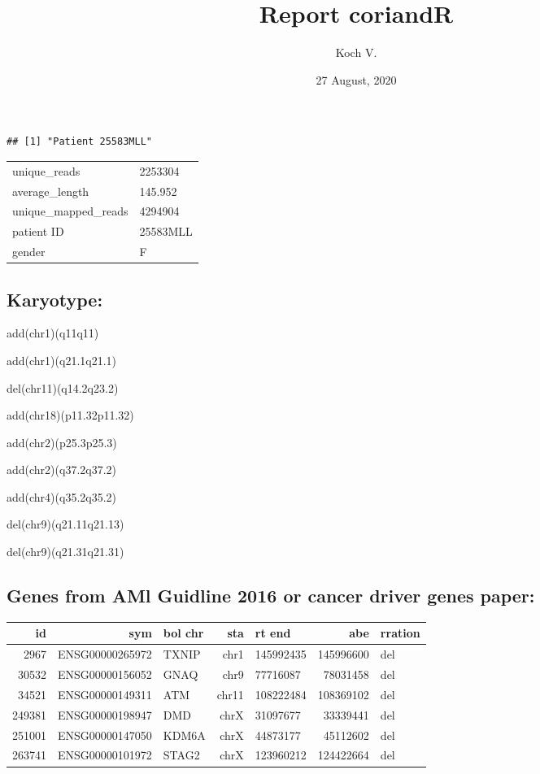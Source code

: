 \documentclass[]{article}
\title{Report coriandR}
\author{Koch V.}
\date{27 August, 2020}
\begin{document}
\maketitle

\begin{verbatim}
## [1] "Patient 25583MLL"
\end{verbatim}

\begin{longtable}[]{@{}ll@{}}
\toprule
\endhead
unique\_reads & 2253304\tabularnewline
average\_length & 145.952\tabularnewline
unique\_mapped\_reads & 4294904\tabularnewline
patient ID & 25583MLL\tabularnewline
gender & F\tabularnewline
\bottomrule
\end{longtable}

\hypertarget{karyotype}{%
\subsection{Karyotype:}\label{karyotype}}

add(chr1)(q11q11)

add(chr1)(q21.1q21.1)

del(chr11)(q14.2q23.2)

add(chr18)(p11.32p11.32)

add(chr2)(p25.3p25.3)

add(chr2)(q37.2q37.2)

add(chr4)(q35.2q35.2)

del(chr9)(q21.11q21.13)

del(chr9)(q21.31q21.31)

\hypertarget{genes-from-aml-guidline-2016-or-cancer-driver-genes-paper}{%
\subsection{Genes from AMl Guidline 2016 or cancer driver genes
paper:}\label{genes-from-aml-guidline-2016-or-cancer-driver-genes-paper}}

\begin{longtable}[]{@{}rrlrlrl@{}}
\toprule
id & sym & bol chr & sta & rt end & abe & rration\tabularnewline
\midrule
\endhead
2967 & ENSG00000265972 & TXNIP & chr1 & 145992435 & 145996600 &
del\tabularnewline
30532 & ENSG00000156052 & GNAQ & chr9 & 77716087 & 78031458 &
del\tabularnewline
34521 & ENSG00000149311 & ATM & chr11 & 108222484 & 108369102 &
del\tabularnewline
249381 & ENSG00000198947 & DMD & chrX & 31097677 & 33339441 &
del\tabularnewline
251001 & ENSG00000147050 & KDM6A & chrX & 44873177 & 45112602 &
del\tabularnewline
263741 & ENSG00000101972 & STAG2 & chrX & 123960212 & 124422664 &
del\tabularnewline
\bottomrule
\end{longtable}
\end{document}
